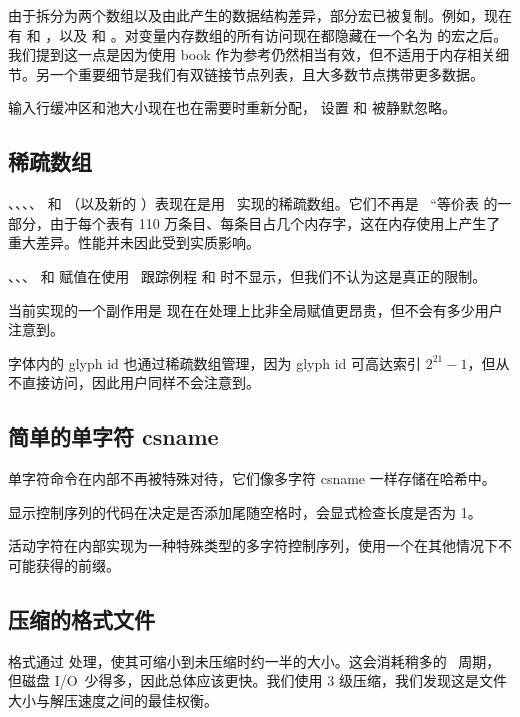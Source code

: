 由于拆分为两个数组以及由此产生的数据结构差异，部分宏已被复制。例如，现在有  和 ，以及  和 。对变量内存数组的所有访问现在都隐藏在一个名为  的宏之后。我们提到这一点是因为使用 \TEX book 作为参考仍然相当有效，但不适用于内存相关细节。另一个重要细节是我们有双链接节点列表，且大多数节点携带更多数据。

输入行缓冲区和池大小现在也在需要时重新分配， 设置  和  被静默忽略。

\subsection{稀疏数组}

、、、、 和 （以及新的 ）表现在是用 \CCODE\ 实现的稀疏数组。它们不再是 \TEX\ ``等价表 的一部分，由于每个表有 110 万条目、每条目占几个内存字，这在内存使用上产生了重大差异。性能并未因此受到实质影响。

、、、 和  赋值在使用 \ETEX\ 跟踪例程  和  时不显示，但我们不认为这是真正的限制。

当前实现的一个副作用是  现在在处理上比非全局赋值更昂贵，但不会有多少用户注意到。

字体内的 glyph id 也通过稀疏数组管理，因为 glyph id 可高达索引 $2^{21}-1$，但从不直接访问，因此用户同样不会注意到。

\subsection{简单的单字符 csname}


单字符命令在内部不再被特殊对待，它们像多字符 csname 一样存储在哈希中。

显示控制序列的代码在决定是否添加尾随空格时，会显式检查长度是否为 1。

活动字符在内部实现为一种特殊类型的多字符控制序列，使用一个在其他情况下不可能获得的前缀。

\subsection{压缩的格式文件}


格式通过  处理，使其可缩小到未压缩时约一半的大小。这会消耗稍多的 \CPU\ 周期，但磁盘 I/O\ 少得多，因此总体应该更快。我们使用 3 级压缩，我们发现这是文件大小与解压速度之间的最佳权衡。

